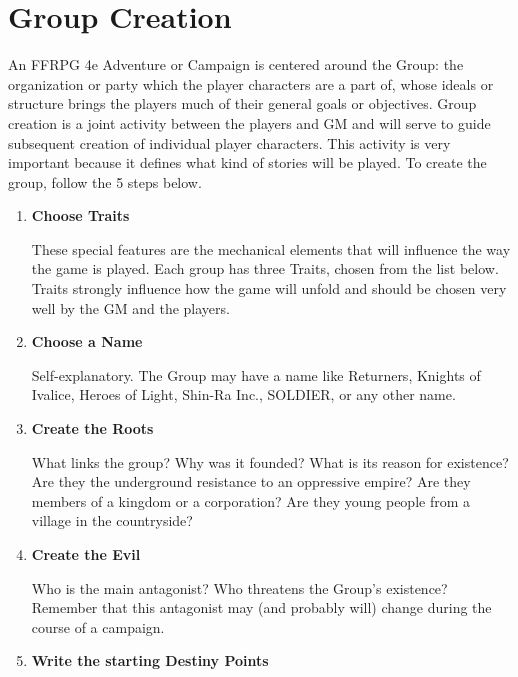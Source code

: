 \begin{center}
\end{center}

\section{Group Creation}\label{sec:group}
\begin{multicols}{2}
An FFRPG 4e Adventure or Campaign is centered around the Group: the organization or party which the player characters are a part of, whose ideals or structure brings the players much of their general goals or objectives. Group creation is a joint activity between the players and GM and will serve to guide subsequent creation of individual player characters. This activity is very important because it defines what kind of stories will be played. To create the group, follow the 5 steps below.
\begin{enumerate}

\item \textbf{Choose Traits}

These special features are the mechanical elements that will influence the way the game is played. Each group has three Traits, chosen from the list below. Traits strongly influence how the game will unfold and should be chosen very well by the GM and the players.

\item \textbf{Choose a Name}

Self-explanatory. The Group may have a name like Returners, Knights of Ivalice, Heroes of Light, Shin-Ra Inc., SOLDIER, or any other name.

\item \textbf{Create the Roots}

What links the group? Why was it founded? What is its reason for existence? Are they the underground resistance to an oppressive empire? Are they members of a kingdom or a corporation? Are they young people from a village in the countryside?

\item \textbf{Create the Evil}

Who is the main antagonist? Who threatens the Group’s existence? Remember that this antagonist may (and probably will) change during the course of a campaign.

\item \textbf{Write the starting Destiny Points}


\end{enumerate}
\end{multicols}
